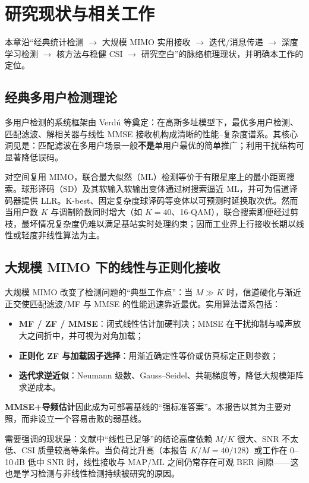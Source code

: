 \chapter{研究现状与相关工作}
\label{ch:survey}

本章沿“经典统计检测 $\to$ 大规模 MIMO 实用接收 $\to$ 迭代/消息传递 $\to$ 深度学习检测 $\to$ 核方法与稳健 CSI $\to$ 研究空白”的脉络梳理现状，并明确本工作的定位。

\section{经典多用户检测理论}

多用户检测的系统框架由 Verdú 等奠定\cite{verdú1998}：在高斯多址模型下，最优多用户检测、匹配滤波、解相关器与线性 MMSE 接收机构成清晰的性能--复杂度谱系。其核心洞见是：匹配滤波在多用户场景一般\textbf{不是}单用户最优的简单推广；利用干扰结构可显著降低误码。

对空间复用 MIMO，联合最大似然（ML）检测等价于有限星座上的最小距离搜索。球形译码（SD）及其软输入软输出变体通过树搜索逼近 ML，并可为信道译码器提供 LLR\cite{hassibi2005,hochwald2003,studer2011}。K-best、固定复杂度球译码等变体以可预测时延换取次优。然而当用户数 $K$ 与调制阶数同时增大（如 $K=40$、16-QAM），联合搜索即便经过剪枝，最坏情况复杂度仍难以满足基站实时处理约束；因而工业界上行接收长期以线性或轻度非线性算法为主。

\section{大规模 MIMO 下的线性与正则化接收}

大规模 MIMO 改变了检测问题的“典型工作点”\cite{marzetta2010,larsson2014,bjornson2017}：当 $M\gg K$ 时，信道硬化与渐近正交使匹配滤波/MF 与 MMSE 的性能迅速靠近最优\cite{hoydis2013}。实用算法谱系包括：
\begin{itemize}
  \item \textbf{MF / ZF / MMSE}：闭式线性估计加硬判决；MMSE 在干扰抑制与噪声放大之间折中，并可视为对角加载\cite{tse2005,kay1993}；
  \item \textbf{正则化 ZF 与加载因子选择}：用渐近确定性等价或仿真标定正则参数；
  \item \textbf{迭代求逆近似}：Neumann 级数、Gauss--Seidel、共轭梯度等，降低大规模矩阵求逆成本。
\end{itemize}
\textbf{MMSE+导频估计}因此成为可部署基线的“强标准答案”。本报告以其为主要对照，而非设立一个容易击败的弱基线。

需要强调的现状是：文献中“线性已足够”的结论高度依赖 $M/K$ 很大、SNR 不太低、CSI 质量较高等条件。当负荷比升高（本报告 $K/M=40/128$）或工作在 0--10\,dB 低中 SNR 时，线性接收与 MAP/ML 之间仍常存在可观 BER 间隙——这也是学习检测与非线性检测持续被研究的原因。

